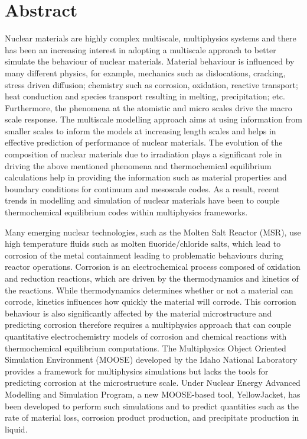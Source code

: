 \chapter*{Abstract}


Nuclear materials are highly complex multiscale, multiphysics systems and there has been an increasing interest in adopting a multiscale approach to better simulate the behaviour of nuclear materials. Material behaviour is influenced by many different physics, for example, mechanics such as dislocations, cracking, stress driven diffusion; chemistry such as corrosion, oxidation, reactive transport; heat conduction and species transport resulting in melting, precipitation; etc. Furthermore, the phenomena at the atomistic and micro scales drive the macro scale response. The multiscale modelling approach aims at using information from smaller scales to inform the models at increasing length scales and helps in effective prediction of performance of nuclear materials. The evolution of the composition of nuclear materials due to irradiation plays a significant role in driving the above mentioned phenomena and thermochemical equilibrium calculations help in providing the information such as material properties and boundary conditions for continuum and mesoscale codes. As a result, recent trends in modelling and simulation of nuclear materials have been to couple thermochemical equilibrium codes within multiphysics frameworks.

Many emerging nuclear technologies, such as the Molten Salt Reactor (MSR), use high temperature fluids such as molten fluoride/chloride salts, which lead to corrosion of the metal containment leading to problematic behaviours during reactor operations. Corrosion is an electrochemical process composed of oxidation and reduction reactions, which are driven by the thermodynamics and kinetics of the reactions. While thermodynamics determines whether or not a material can corrode, kinetics influences how quickly the material will corrode. This corrosion behaviour is also significantly affected by the material microstructure and predicting corrosion therefore requires a multiphysics approach that can couple quantitative electrochemistry models of corrosion and chemical reactions with thermochemical equilibrium computations. The Multiphysics Object Oriented Simulation Environment (MOOSE) developed by the Idaho National Laboratory provides a framework for multiphysics simulations but lacks the tools for predicting corrosion at the microstructure scale. Under Nuclear Energy Advanced Modelling and Simulation Program, a new MOOSE-based tool, YellowJacket, has been developed to perform such simulations and to predict quantities such as the rate of material loss, corrosion product production, and precipitate production in liquid.

